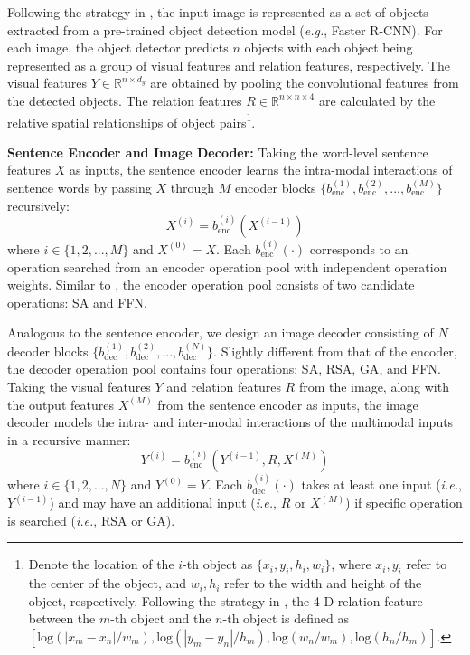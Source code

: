\documentclass[sigconf]{acmart}
\begin{document}
Following the strategy in \cite{anderson2017up-down}, the input image is represented as a set of objects extracted from a pre-trained object detection model (\emph{e.g.}, Faster R-CNN). For each image, the object detector predicts $n$ objects with each object being represented as a group of visual features and relation features, respectively. The visual features $Y\in\mathbb{R}^{n\times d_y}$ are obtained by pooling the convolutional features from the detected objects. The relation features $R\in\mathbb{R}^{n\times n\times 4}$ are calculated by the relative spatial relationships of object pairs\footnote{Denote the location of the $i$-th object as $\{x_i, y_i, h_i, w_i\}$, where $x_i, y_i$ refer to the center of the object, and $w_i, h_i$ refer to the width and height of the object, respectively. Following the strategy in \cite{hu2018relation}, the 4-D relation feature between the $m$-th object and the $n$-th object is defined as $\left[\mathrm{log}({|x_m-x_n|}/{w_m}), \mathrm{log}({|y_m-y_n|}/{h_m}), \mathrm{log}({w_n}/{w_m}),\mathrm{log}({h_n}/{h_m}) \right]$.}.

\noindent\textbf{Sentence Encoder and Image Decoder:}
Taking the word-level sentence features $X$ as inputs, the sentence encoder learns the intra-modal interactions of sentence words by passing $X$ through $M$ encoder blocks $\{b_\textrm{enc}^{(1)}, b_\textrm{enc}^{(2)}, ..., b_\textrm{enc}^{(M)}\}$ recursively:
\begin{equation}\label{eq:enc}
X^{(i)} = b_\textrm{enc}^{(i)}(X^{(i-1)})
\end{equation}
where $i\in\{1,2,..., M\}$ and $X^{(0)}=X$. Each $b_\textrm{enc}^{(i)}(\cdot)$ corresponds to an operation searched from an encoder operation pool with independent operation weights. Similar to \cite{yu2019mcan}, the encoder operation pool consists of two candidate operations: \textsf{SA} and \textsf{FFN}.

Analogous to the sentence encoder, we design an image decoder consisting of $N$ decoder blocks $\{b_\textrm{dec}^{(1)}, b_\textrm{dec}^{(2)}, ..., b_\textrm{dec}^{(N)}\}$. Slightly different from that of the encoder, the decoder operation pool contains four operations: \textsf{SA}, \textsf{RSA}, \textsf{GA}, and \textsf{FFN}. Taking the visual features $Y$ and relation features $R$ from the image, along with the output features $X^{(M)}$ from the sentence encoder as inputs, the image decoder models the intra- and inter-modal interactions of the multimodal inputs in a recursive manner:
\begin{equation}\label{eq:dec}
Y^{(i)} = b_\textrm{enc}^{(i)}(Y^{(i-1)}, R, X^{(M)})
\end{equation}
where $i\in\{1,2,..., N\}$ and $Y^{(0)}=Y$. Each $b_\textrm{dec}^{(i)}(\cdot)$ takes at least one input (\emph{i.e.}, $Y^{(i-1)}$) and may have an additional input (\emph{i.e.}, $R$ or $X^{(M)}$) if specific operation is searched (\emph{i.e.}, \textsf{RSA} or \textsf{GA}).
\end{document}
